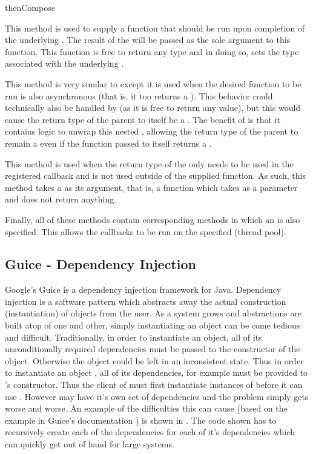 \begin{labeling}{thenCompose}
	\item [thenApply] This method is used to supply a function that should be run upon completion of the underlying . The result of the  will be passed as the sole argument to this function. This function is free to return any type and in doing so, sets the type associated with the underlying . 
	\item [thenCompose] This method is very similar to  except it is used when the desired function to be run is also asynchronous (that is, it too returns a ). This behavior could technically also be handled by  (as it is free to return any value), but this would cause the return type of the parent  to itself be a . The benefit of  is that it contains logic to unwrap this nested , allowing the return type of the parent to remain a  even if the function passed to  itself returns a .
	\item [thenAccept] This method is used when the return type of the  only needs to be used in the registered callback and is not used outside of the supplied function. As such, this method takes a  as its argument, that is, a function which takes  as a parameter and does not return anything.  
\end{labeling}

Finally, all of these methods contain corresponding methods in which an  is also specified. This allows the callbacks to be run on the specified  (thread pool).


\subsection{Guice - Dependency Injection}\label{sec:guice}
Google's Guice \cite{guice} is a dependency injection framework for Java. Dependency injection is a software pattern which abstracts away the actual construction (instantiation) of objects from the user. As a system grows and abstractions are built atop of one and other, simply instantiating an object can be come tedious and difficult. Traditionally, in order to instantiate an object, all of its unconditionally required dependencies must be passed to the constructor of the object. Otherwise the object could be left in an inconsistent state. Thus in order to instantiate an object , all of its dependencies, for example  must be provided to 's constructor. Thus the client of  must first instantiate instances of  before it can use . However  may have it's own set of dependencies and the problem simply gets worse and worse. An example of the difficulties this can cause (based on the example in Guice's documentation \cite{guiceDocs}) is shown in . The code shown has to recursively create each of the dependencies for each of it's dependencies which can quickly get out of hand for large systems.

